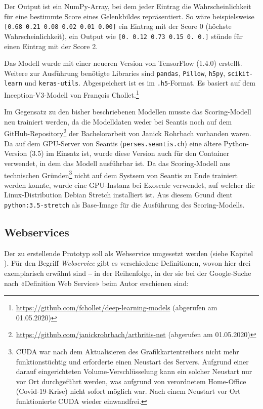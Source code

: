 Der Output ist ein NumPy-Array, bei dem jeder Eintrag die Wahrscheinlichkeit für eine bestimmte Score eines Gelenkbildes repräsentiert. So wäre beispielsweise \texttt{[0.68 0.21 0.08 0.02 0.01 0.00]} ein Eintrag mit der Score 0 (höchste Wahrscheinlichkeit), ein Output wie \texttt{[0. 0.12 0.73 0.15 0. 0.]} stünde für einen Eintrag mit der Score 2.

Das Modell wurde mit einer neueren Version von TensorFlow (1.4.0) erstellt. Weitere zur Ausführung benötigte Libraries sind \texttt{pandas}, \texttt{Pillow}, \texttt{h5py}, \texttt{scikit-learn} und \texttt{keras-utils}. Abgespeichert ist es im \texttt{.h5}-Format. Es basiert auf dem Inception-V3-Modell von François Chollet.\footnote{\url{https://github.com/fchollet/deep-learning-models} (abgerufen am 01.05.2020)}

Im Gegensatz zu den bisher beschriebenen Modellen musste das Scoring-Modell neu trainiert werden, da die Modelldaten weder bei Seantis noch auf dem GitHub-Repository\footnote{\url{https://github.com/janickrohrbach/arthritis-net} (abgerufen am 01.05.2020)} der Bachelorarbeit von Janick Rohrbach vorhanden waren. Da auf dem GPU-Server von Seantis (\texttt{perses.seantis.ch}) eine ältere Python-Version (3.5) im Einsatz ist, wurde diese Version auch für den Container verwendet, in dem das Modell ausführbar ist. Da das Scoring-Modell aus technischen Gründen\footnote{CUDA war nach dem Aktualisieren des Grafikkartentreibers nicht mehr funktionstüchtig und erforderte einen Neustart des Servers. Aufgrund einer darauf eingerichteten Volume-Verschlüsselung kann ein solcher Neustart nur vor Ort durchgeführt werden, was aufgrund von verordnetem Home-Office (Covid-19-Krise) nicht sofort möglich war. Nach einem Neustart vor Ort funktionierte CUDA wieder einwandfrei.} nicht auf dem Systsem von Seantis zu Ende trainiert werden konnte, wurde eine GPU-Instanz bei Exoscale verwendet, auf welcher die Linux-Distribution Debian Stretch installiert ist. Aus diesem Grund dient \texttt{python:3.5-stretch} als Base-Image für die Ausführung des Scoring-Modells.

\subsection{Webservices}
\label{sec:web-services}

Der zu erstellende Prototyp soll als Webservice umgesetzt werden (siehe Kapitel ). Für den Begriff \textit{Webservice} gibt es verschiedene Definitionen, wovon hier drei exemplarisch erwähnt sind ‒ in der Reihenfolge, in der sie bei der Google-Suche nach «Definition Web Service» beim Autor erschienen sind:

